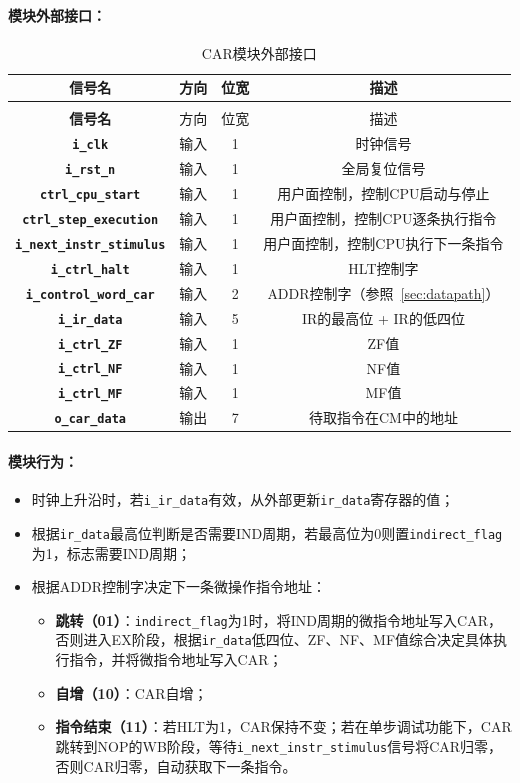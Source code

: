 \documentclass[lang=cn,a4paper,newtx]{elegantpaper}
\begin{document}
\paragraph{模块外部接口：}
\begin{longtable}{>{\bfseries}c c c c}
  \caption{CAR模块外部接口} \\
  \toprule
  信号名 & 方向 & 位宽 & 描述 \\
  \midrule
  \endfirsthead

  \multicolumn{4}{l}{\textbf{（续表）CAR模块外部接口}} \\
  \toprule
  信号名 & 方向 & 位宽 & 描述 \\
  \midrule
  \endhead
  \texttt{i\_clk}  & 输入 & 1& 时钟信号\\
  \texttt{i\_rst\_n}  & 输入 &1 & 全局复位信号 \\
  \texttt{ctrl\_cpu\_start}     & 输入 & 1 & 用户面控制，控制CPU启动与停止 \\
  \texttt{ctrl\_step\_execution} & 输入 & 1 & 用户面控制，控制CPU逐条执行指令 \\
  \texttt{i\_next\_instr\_stimulus}  & 输入 & 1 & 用户面控制，控制CPU执行下一条指令\\
  \texttt{i\_ctrl\_halt} & 输入 & 1 & HLT控制字 \\
  \texttt{i\_control\_word\_car} & 输入 & 2 & ADDR控制字（参照~\ref{sec:datapath}）\\
  \texttt{i\_ir\_data}  & 输入 & 5 & IR的最高位 + IR的低四位 \\
  \texttt{i\_ctrl\_ZF}  & 输入 & 1 & ZF值 \\
  \texttt{i\_ctrl\_NF}  & 输入 & 1 & NF值 \\
  \texttt{i\_ctrl\_MF}  & 输入 & 1 & MF值 \\
  \texttt{o\_car\_data} & 输出 & 7 & 待取指令在CM中的地址 \\
  \bottomrule
\end{longtable}
\paragraph{模块行为：}
\begin{itemize}
  \item 时钟上升沿时，若\texttt{i\_ir\_data}有效，从外部更新\texttt{ir\_data}寄存器的值；
  \item 根据\texttt{ir\_data}最高位判断是否需要IND周期，若最高位为0则置\texttt{indirect\_flag}为1，标志需要IND周期；
  \item 根据ADDR控制字决定下一条微操作指令地址：
  \begin{itemize}
    \item \textbf{跳转（01）}：\texttt{indirect\_flag}为1时，将IND周期的微指令地址写入CAR，否则进入EX阶段，根据\texttt{ir\_data}低四位、ZF、NF、MF值综合决定具体执行指令，并将微指令地址写入CAR；
    \item \textbf{自增（10）}：CAR自增；
    \item \textbf{指令结束（11）}：若HLT为1，CAR保持不变；若在单步调试功能下，CAR跳转到NOP的WB阶段，等待\texttt{i\_next\_instr\_stimulus}信号将CAR归零，否则CAR归零，自动获取下一条指令。
  \end{itemize}
\end{itemize}
\end{document}
